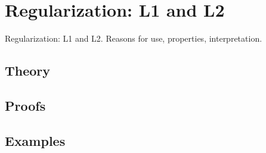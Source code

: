 
\section{Regularization: L1 and L2}
\label{sec:1.4.03-regularization}

\begin{ticket}
Regularization: L1 and L2. Reasons for use, properties, interpretation.
\end{ticket}

\subsection*{Theory}

\subsection*{Proofs}

\subsection*{Examples}
